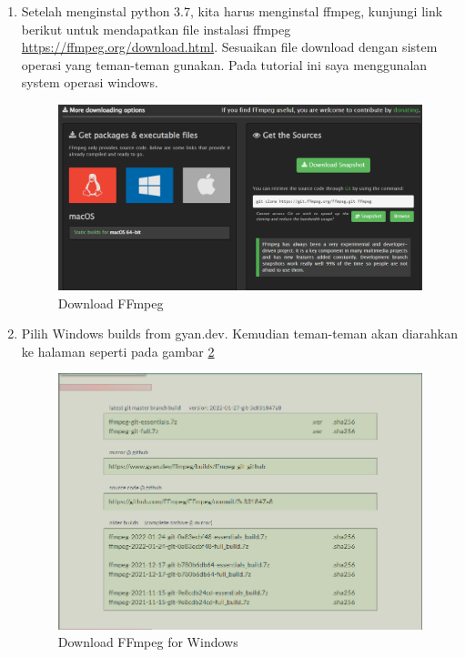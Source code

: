 \begin{enumerate}

\item Setelah menginstal python 3.7, kita harus menginstal ffmpeg, kunjungi link berikut untuk mendapatkan file instalasi ffmpeg \small \url{https://ffmpeg.org/download.html}. Sesuaikan file download dengan sistem operasi yang teman-teman gunakan. Pada tutorial ini saya menggunalan system operasi windows.
\begin{figure}[H]
\centering
\includegraphics[scale=.35]{figures/python5}
\caption{Download FFmpeg}
\label{python5}
\end{figure}

\item Pilih Windows builds from gyan.dev. Kemudian teman-teman akan diarahkan ke halaman seperti pada gambar \ref{python6}
\begin{figure}[H]
\centering
\includegraphics[scale=.4]{figures/python6}
\caption{Download FFmpeg for Windows}
\label{python6}
\end{figure}


\end{enumerate}
